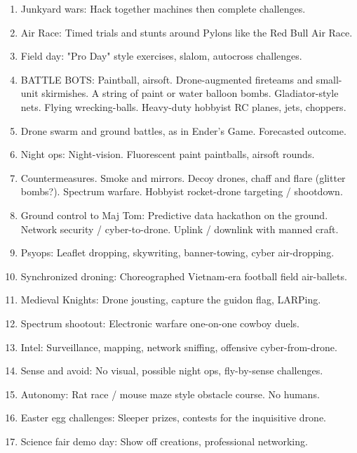 \documentclass[10pt, letterpaper]{article}
\begin{document}

\begin{enumerate}

\item Junkyard wars: Hack together machines then complete challenges.

\item Air Race: Timed trials and stunts around Pylons like the Red Bull Air Race.

\item Field day: "Pro Day" style exercises, slalom, autocross challenges.

\item BATTLE BOTS: Paintball, airsoft. Drone-augmented fireteams and small-unit skirmishes. A string of paint or water balloon bombs. Gladiator-style nets. Flying wrecking-balls. Heavy-duty hobbyist RC planes, jets, choppers.

\item Drone swarm  and ground battles, as in Ender's Game. Forecasted outcome.

\item Night ops: Night-vision. Fluorescent paint paintballs, airsoft rounds. 

\item Countermeasures.  Smoke and mirrors. Decoy drones, chaff and flare (glitter bombs?). Spectrum warfare. Hobbyist rocket-drone targeting / shootdown.

\item Ground control to Maj Tom: Predictive data hackathon on the ground. Network security / cyber-to-drone. Uplink / downlink with manned craft.

\item Psyops: Leaflet dropping, skywriting, banner-towing, cyber air-dropping.

\item Synchronized droning: Choreographed Vietnam-era football field air-ballets.

\item Medieval Knights: Drone jousting, capture the guidon flag, LARPing.

\item Spectrum shootout: Electronic warfare one-on-one cowboy duels.

\item Intel: Surveillance, mapping, network sniffing, offensive cyber-from-drone.

\item Sense and avoid: No visual, possible night ops, fly-by-sense challenges.

\item Autonomy: Rat race / mouse maze style obstacle course. No humans.

\item Easter egg challenges: Sleeper prizes, contests for the inquisitive drone.

\item Science fair demo day: Show off creations, professional networking.

\end{enumerate}
\end{document}
